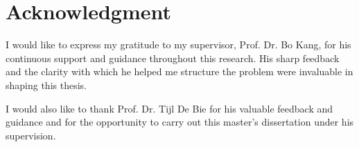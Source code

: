 \chapter*{Acknowledgment}

I would like to express my gratitude to my supervisor, Prof. Dr. Bo Kang, 
for his continuous support and guidance throughout this research. His sharp 
feedback and the clarity with which he helped me structure the problem were 
invaluable in shaping this thesis.

I would also like to thank Prof. Dr. Tijl De Bie for his valuable feedback and guidance and for the opportunity to carry out this master's dissertation under his supervision.

